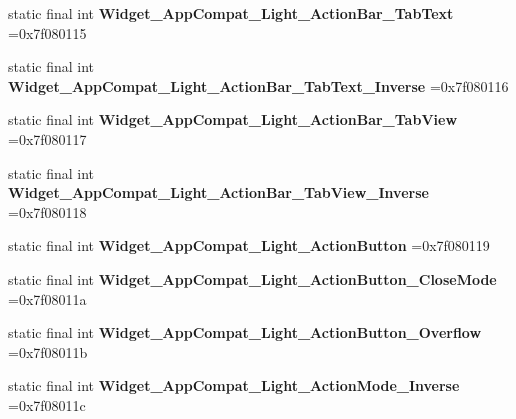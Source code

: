 \begin{DoxyCompactItemize}
\item 
\hypertarget{classcheck_1_1test_1_1_r_1_1style_ab9ee3612f9fe82d5409846833312d8c4}{}static final int {\bfseries Widget\+\_\+\+App\+Compat\+\_\+\+Light\+\_\+\+Action\+Bar\+\_\+\+Tab\+Text} =0x7f080115\label{classcheck_1_1test_1_1_r_1_1style_ab9ee3612f9fe82d5409846833312d8c4}

\item 
\hypertarget{classcheck_1_1test_1_1_r_1_1style_a3ef5805206ee9c5f072aaf44c4cdb640}{}static final int {\bfseries Widget\+\_\+\+App\+Compat\+\_\+\+Light\+\_\+\+Action\+Bar\+\_\+\+Tab\+Text\+\_\+\+Inverse} =0x7f080116\label{classcheck_1_1test_1_1_r_1_1style_a3ef5805206ee9c5f072aaf44c4cdb640}

\item 
\hypertarget{classcheck_1_1test_1_1_r_1_1style_ab73a543a5a84e48aff236050a30f9385}{}static final int {\bfseries Widget\+\_\+\+App\+Compat\+\_\+\+Light\+\_\+\+Action\+Bar\+\_\+\+Tab\+View} =0x7f080117\label{classcheck_1_1test_1_1_r_1_1style_ab73a543a5a84e48aff236050a30f9385}

\item 
\hypertarget{classcheck_1_1test_1_1_r_1_1style_a7958086f5d485eb1ad9741182e44a417}{}static final int {\bfseries Widget\+\_\+\+App\+Compat\+\_\+\+Light\+\_\+\+Action\+Bar\+\_\+\+Tab\+View\+\_\+\+Inverse} =0x7f080118\label{classcheck_1_1test_1_1_r_1_1style_a7958086f5d485eb1ad9741182e44a417}

\item 
\hypertarget{classcheck_1_1test_1_1_r_1_1style_aad7b23eb50853f496e606f50ed15ec59}{}static final int {\bfseries Widget\+\_\+\+App\+Compat\+\_\+\+Light\+\_\+\+Action\+Button} =0x7f080119\label{classcheck_1_1test_1_1_r_1_1style_aad7b23eb50853f496e606f50ed15ec59}

\item 
\hypertarget{classcheck_1_1test_1_1_r_1_1style_a27e9ca3b5772f2b3a54781940960de2b}{}static final int {\bfseries Widget\+\_\+\+App\+Compat\+\_\+\+Light\+\_\+\+Action\+Button\+\_\+\+Close\+Mode} =0x7f08011a\label{classcheck_1_1test_1_1_r_1_1style_a27e9ca3b5772f2b3a54781940960de2b}

\item 
\hypertarget{classcheck_1_1test_1_1_r_1_1style_a1bbc5414a792ba6f90ef377b26aadc45}{}static final int {\bfseries Widget\+\_\+\+App\+Compat\+\_\+\+Light\+\_\+\+Action\+Button\+\_\+\+Overflow} =0x7f08011b\label{classcheck_1_1test_1_1_r_1_1style_a1bbc5414a792ba6f90ef377b26aadc45}

\item 
\hypertarget{classcheck_1_1test_1_1_r_1_1style_a4d0ad29a15c17a5fa48998cd46885ed8}{}static final int {\bfseries Widget\+\_\+\+App\+Compat\+\_\+\+Light\+\_\+\+Action\+Mode\+\_\+\+Inverse} =0x7f08011c\label{classcheck_1_1test_1_1_r_1_1style_a4d0ad29a15c17a5fa48998cd46885ed8}


\end{DoxyCompactItemize}
